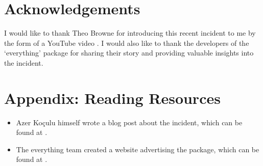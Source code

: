 \documentclass[acmsmall]{acmart}
\begin{document}
\section{Acknowledgements}
I would like to thank Theo Browne for introducing this recent incident to me by
the form of a YouTube video \cite{youtube-everything}. I would also like to
thank the developers of the `everything' package for sharing their story and
providing valuable insights into the incident.




\appendix
\section{Appendix: Reading Resources}
\begin{itemize}
  \item Azer Koçulu himself wrote a blog post about the incident, which can be
        found at \cite{appendix-medium-azer}.
  \item The everything team created a website advertising the package, which can
        be found at \cite{appendix-everything-website}.
\end{itemize}
\end{document}
